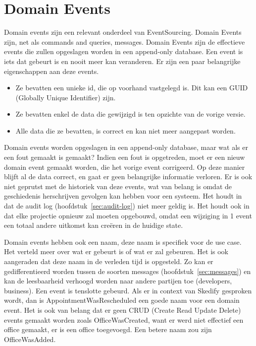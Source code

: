 
\section{Domain Events}
\label{sec:domain-events}

Domain events zijn een relevant onderdeel van EventSourcing. Domain Events zijn, net als commands and queries, messages. Domain Events zijn de effectieve events die zullen opgeslagen worden in een append-only database. Een event is iets dat gebeurt is en nooit meer kan veranderen. Er zijn een paar belangrijke eigenschappen aan deze events.

\begin{itemize}
  \item{Ze bevatten een unieke id, die op voorhand vastgelegd is. Dit kan een GUID (Globally Unique Identifier) zijn.}
  \item{Ze bevatten enkel de data die gewijzigd is ten opzichte van de vorige versie.}
  \item{Alle data die ze bevatten, is correct en kan niet meer aangepast worden.}
\end{itemize}

Domain events worden opgeslagen in een append-only database, maar wat als er een fout gemaakt is gemaakt?
Indien een fout is opgetreden, moet er een nieuw domain event gemaakt worden, die het vorige event corrigeerd. Op deze manier blijft al de data correct, en gaat er geen belangrijke informatie verloren. Er is ook niet geprutst met de historiek van deze events, wat van belang is omdat de geschiedenis herschrijven gevolgen kan hebben voor een systeem. Het houdt in dat de audit log (hoofdstuk~\ref{sec:audit-log}) niet meer geldig is. Het houdt ook in dat elke projectie opnieuw zal moeten opgebouwd, omdat een wijziging in 1 event een totaal andere uitkomst kan creëren in de huidige state.

Domain events hebben ook een naam, deze naam is specifiek voor de use case. Het verteld meer over wat er gebeurt is of wat er zal gebeuren. Het is ook aangeraden dat deze naam in de verleden tijd is opgesteld. Zo kan er gedifferentieerd worden tussen de soorten messages (hoofdstuk~\ref{sec:messages}) en kan de leesbaarheid verhoogd worden naar andere partijen toe (developers, business). Een event is tenslotte gebeurd. Als er in context van Skedify gesproken wordt, dan is AppointmentWasRescheduled een goede naam voor een domain event. Het is ook van belang dat er geen CRUD (Create Read Update Delete) events gemaakt worden zoals OfficeWasCreated, want er werd niet effectief een office gemaakt, er is een office toegevoegd. Een betere naam zou zijn OfficeWasAdded.
